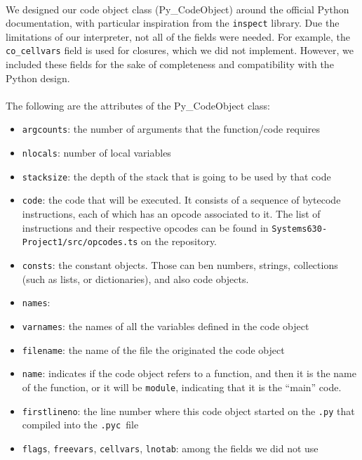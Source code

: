 \documentclass{article}
\newcommand{\pyc}{\texttt{.pyc~}}
\begin{document}
\paragraph{}
We designed our code object class (Py\_CodeObject) around the official Python documentation, with particular inspiration from the \texttt{inspect} library. Due the limitations of our interpreter, not all of the fields were needed. For example, the \texttt{co\_cellvars} field is used for closures, which we did not implement. However, we included these fields for the sake of completeness and compatibility with the Python design.

\paragraph{}
The following are the attributes of the Py\_CodeObject class:

\begin{itemize}
	\item \texttt{argcounts}: the number of arguments that the function/code requires
	\item \texttt{nlocals}: number of local variables
	\item \texttt{stacksize}: the depth of the stack that is going to be used by that code
	\item \texttt{code}: the code that will be executed. It consists of a sequence of bytecode instructions, each of which has an opcode associated to it. The list of instructions and their respective opcodes can be found in \texttt{Systems630-Project1/src/opcodes.ts} on the repository.
	\item \texttt{consts}: the constant objects. Those can ben numbers, strings, collections (such as lists, or dictionaries), and also code objects.  
	\item \texttt{names}: 
	\item \texttt{varnames}: the names of all the variables defined in the code object
	\item \texttt{filename}: the name of the file the originated the code object
	\item \texttt{name}: indicates if the code object refers to a function, and then it is the name of the function, or it will be \texttt{module}, indicating that it is the ``main'' code.
	\item \texttt{firstlineno}: the line number where this code object started on the \texttt{.py} that compiled into the \pyc file
	\item \texttt{flags}, \texttt{freevars}, \texttt{cellvars}, \texttt{lnotab}: among the fields we did not use
	\end{itemize}
\end{document}
